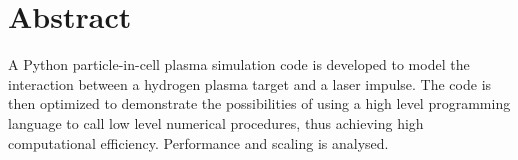 \section{Abstract} %
A Python particle-in-cell plasma simulation code is developed to model the interaction between a hydrogen plasma target
and a laser impulse. The code is then optimized to demonstrate the possibilities of using a high level programming
language to call low level numerical procedures, thus achieving high computational efficiency. Performance and scaling is analysed.
